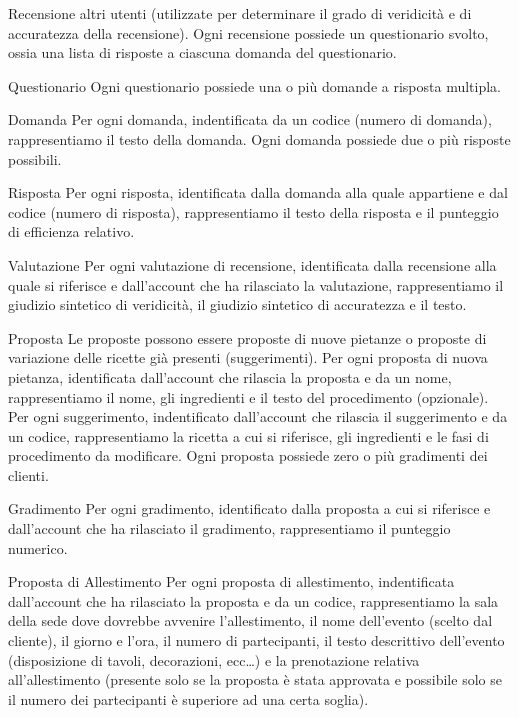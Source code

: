 \begin{center}
\begin{reqtable}{Recensione}
altri utenti (utilizzate per determinare il grado di veridicità e di accuratezza
della recensione). Ogni recensione possiede un questionario svolto, ossia una lista
di risposte a ciascuna domanda del questionario.
\end{reqtable}
\begin{reqtable}{Questionario}
Ogni questionario possiede una o più domande a risposta multipla.
\end{reqtable}
\begin{reqtable}{Domanda}
Per ogni domanda, indentificata da un codice (numero di domanda), rappresentiamo
il testo della domanda. Ogni domanda possiede due o più risposte possibili.
\end{reqtable}
\begin{reqtable}{Risposta}
Per ogni risposta, identificata dalla domanda alla quale appartiene e dal codice
(numero di risposta), rappresentiamo il testo della risposta e il punteggio
di efficienza relativo.
\end{reqtable}
\begin{reqtable}{Valutazione}
Per ogni valutazione di recensione, identificata dalla recensione alla quale si
riferisce e dall'account che ha rilasciato la valutazione, rappresentiamo il giudizio
sintetico di veridicità, il giudizio sintetico di accuratezza e il testo.
\end{reqtable}
\begin{reqtable}{Proposta}
Le proposte possono essere proposte di nuove pietanze o proposte di variazione
delle ricette già presenti (suggerimenti).
Per ogni proposta di nuova pietanza, identificata dall'account che rilascia la proposta
e da un nome, rappresentiamo il nome, gli ingredienti e il testo del procedimento
(opzionale).
Per ogni suggerimento, indentificato dall'account che rilascia il suggerimento e
da un codice, rappresentiamo la ricetta a cui si riferisce, gli ingredienti e le
fasi di procedimento da modificare. Ogni proposta possiede zero o più gradimenti
dei clienti.
\end{reqtable}
\begin{reqtable}{Gradimento}
Per ogni gradimento, identificato dalla proposta a cui si riferisce e dall'account
che ha rilasciato il gradimento, rappresentiamo il punteggio numerico.
\end{reqtable}
\begin{reqtable}{Proposta di Allestimento}
Per ogni proposta di allestimento, indentificata dall'account che ha rilasciato la
proposta e da un codice, rappresentiamo la sala della sede dove dovrebbe avvenire
l'allestimento, il nome dell'evento (scelto dal cliente), il giorno e l'ora,
il numero di partecipanti, il testo descrittivo dell'evento (disposizione di tavoli,
decorazioni, ecc\ldots) e la prenotazione relativa all'allestimento (presente solo
se la proposta è stata approvata e possibile solo se il numero dei partecipanti
è superiore ad una certa soglia).
\end{reqtable}
\end{center}
